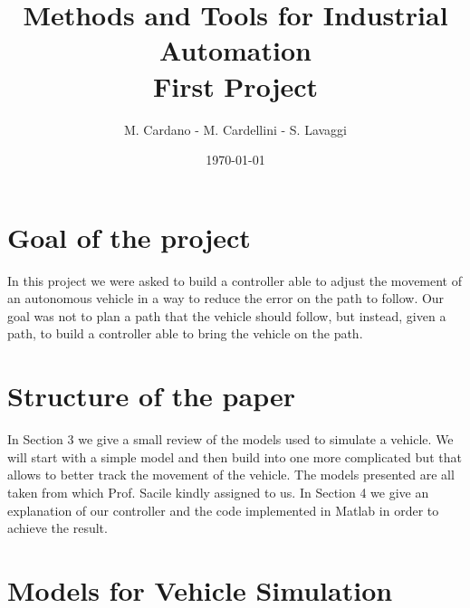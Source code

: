 \documentclass{article}
\title{Methods and Tools for Industrial Automation \\ First Project}
\author{M. Cardano - M. Cardellini - S. Lavaggi}
\date{\today}
\begin{document}
\maketitle

\section{Goal of the project}
In this project we were asked to build a controller able to adjust the movement of an autonomous vehicle in a way to reduce the error on the path to follow. Our goal was not to plan a path that the vehicle should follow, but instead, given a path, to build a controller able to bring the vehicle on the path. 

\section{Structure of the paper}
In Section 3 we give a small review of the models used to simulate a vehicle. We will start with a simple model and then build into one more complicated but that allows to better track the movement of the vehicle. The models presented are all taken from \cite{paper} which Prof. Sacile kindly assigned to us. In Section 4 we give an explanation of our controller and the code implemented in Matlab in order to achieve the result.

\section{Models for Vehicle Simulation}
\end{document}
